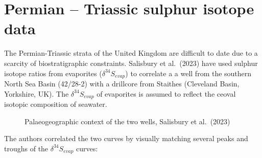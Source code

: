 \documentclass[
  letterpaper,
  DIV=11,
  numbers=noendperiod]{scrartcl}
\begin{document}
\section{Permian -- Triassic sulphur isotope
data}\label{permian-triassic-sulphur-isotope-data}

The Permian-Triassic strata of the United Kingdom are difficult to date
due to a scarcity of biostratigraphic constraints. Salisbury et
al.~(2023) have used sulphur isotope ratios from evaporites
(\(\delta^{34}S_{evap}\)) to correlate a a well from the southern North
Sea Basin (42/28-2) with a drillcore from Staithes (Cleveland Basin,
Yorkshire, UK). The \(\delta^{34}S_{evap}\) of evaporites is assumed to
reflect the ceoval isotopic composition of seawater.

\begin{figure}[H]


\caption{\label{fig-1}Palaeogeographic context of the two wells,
Salisbury et al.~(2023)}

\end{figure}%

The authors correlated the two curves by visually matching several peaks
and troughs of the \(\delta^{34}S_{evap}\) curves:
\end{document}
